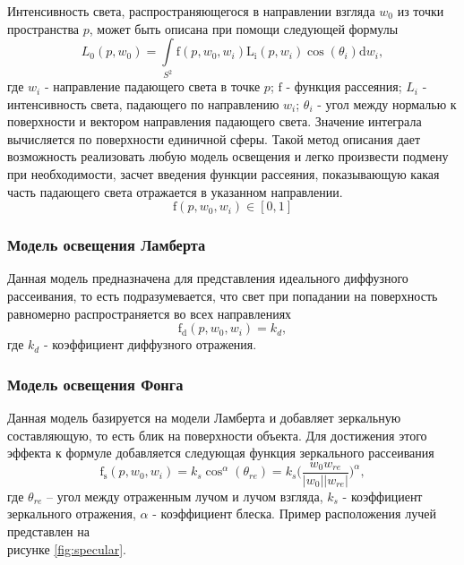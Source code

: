Интенсивность света, распространяющегося в направлении взгляда $w_0$ из точки
пространства $p$, может быть описана при помощи следующей формулы
\begin{equation} \label{math:base_intensity}
    L_0(p, w_0) = \int\limits_{{S^2}^{}} \mathrm{f}(p, w_0, w_i)
                  \mathrm{L_i}(p, w_i) \cos(\theta_i) \mathrm{d} w_i,
\end{equation}
где $w_i$ - направление падающего света в точке $p$; $\mathrm{f}$ - функция
рассеяния; $L_i$ - интенсивность света, падающего по направлению $w_i$;
$\theta_i$ - угол между нормалью к поверхности и вектором направления падающего
света. Значение интеграла вычисляется по поверхности единичной сферы.
Такой метод описания дает возможность реализовать любую модель
освещения и легко произвести подмену при необходимости, засчет введения
функции рассеяния, показывающую какая часть падающего света отражается в
указанном направлении.
\begin{equation}
    \mathrm{f}(p, w_0, w_i) \in [0, 1]
\end{equation}

\subsubsection{Модель освещения Ламберта}
Данная модель предназначена для представления идеального диффузного
рассеивания, то есть подразумевается, что свет при попадании на поверхность
равномерно распространяется во всех направлениях
\begin{equation} \label{math:flambert}
    \mathrm{f_d}(p, w_0, w_i) = k_d,
\end{equation}
где $k_d$ - коэффициент диффузного отражения.

\subsubsection{Модель освещения Фонга}
Данная модель базируется на модели Ламберта и добавляет зеркальную
составляющую, то есть блик на поверхности объекта. Для достижения этого
эффекта к формуле  добавляется следующая функция
зеркального рассеивания
\begin{equation}
    \mathrm{f_s}(p, w_0, w_i) = k_s \cos^\alpha (\theta_{re})
                              = k_s \bigg(\frac{w_0 w_{re}}{{|w_0|}{|w_{re}|}}\bigg)^\alpha,
\end{equation}
где $\theta_{re}$ -- угол между отраженным лучом и лучом взгляда, $k_s$ -
коэффициент зеркального отражения, $\alpha$ - коэффициент блеска. Пример
расположения лучей представлен на\\ рисунке \ref{fig:specular}.

